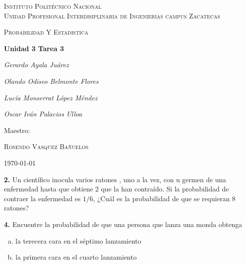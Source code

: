\documentclass[12pt, letterpaper]{article}
\begin{document}
    \begin{titlepage}
        \centering
        {\scshape\LARGE Instituto Politécnico Nacional\\ Unidad Profesional Interdisiplinaria de Ingenierias campus Zacatecas\par}
        \vspace{1cm}
        {\scshape\Large Probabilidad Y Estadistica\par}
        \vspace{1.5cm}
        {\huge\bfseries Unidad 3 Tarea 3\par}
        \vspace{2cm}
        {\Large\itshape Gerardo Ayala Juárez\par}
        {\Large\itshape Olando Odiseo Belmonte Flores\par}
        {\Large\itshape Lucía Monserrat López Méndez\par}
        {\Large\itshape Oscar Iván Palacios Ulloa\par}
        \vfill
        Maestro:\par
        \textsc{
        Rosendo Vasquez Bañuelos}
        \vfill
        {\large \today \par}
    \end{titlepage}

    \textbf{2. }Un científico inocula varios ratones , uno a la vez, con u germen de una enfermedad hasta que obtiene 2
    que la han contraído. Si la probabilidad  de contraer la enfermedad es $1/6$, ¿Cuál es la probabilidad de que se
    requieran 8 ratones?\vskip1cm

    \textbf{4. }Encuentre la probabilidad  de que una persona que lanza una monda obtenga\\
    \begin{enumerate}[a)]
        \item la terecera cara en el séptimo lanzamiento
        \item la primera cara en el cuarto lanzamiento
    \end{enumerate}\vskip1cm
\end{document}
